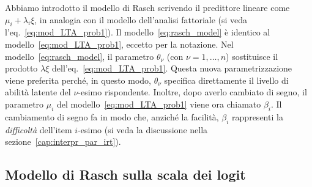 Abbiamo introdotto il modello di Rasch scrivendo il predittore lineare come $\mu_i + \lambda_i \xi$, in analogia con il modello dell'analisi fattoriale (si veda l'eq.~\ref{eq:mod_LTA_prob1}).
Il modello~\ref{eq:rasch_model} è identico al modello~\ref{eq:mod_LTA_prob1}, eccetto per la notazione.
Nel modello~\ref{eq:rasch_model}, il parametro $\theta_{\nu}$ (con $\nu= 1, \dots, n$) sostituisce il prodotto $\lambda\xi$ dell'eq.~\ref{eq:mod_LTA_prob1}. 
Questa nuova parametrizzazione viene preferita perché, in questo modo, $\theta_{\nu}$ specifica direttamente il livello di abilità latente del $\nu$-esimo rispondente.
Inoltre, dopo averlo cambiato di segno, il parametro $\mu_i$ del modello~\ref{eq:mod_LTA_prob1} viene ora chiamato $\beta_i$.
Il cambiamento di segno fa in modo che, anziché la facilità, $\beta_i$ rappresenti la \emph{difficoltà} dell'item $i$-esimo (si veda la discussione nella sezione~\ref{cap:interpr_par_irt}). 


\subsection{Modello di Rasch sulla scala dei logit}

